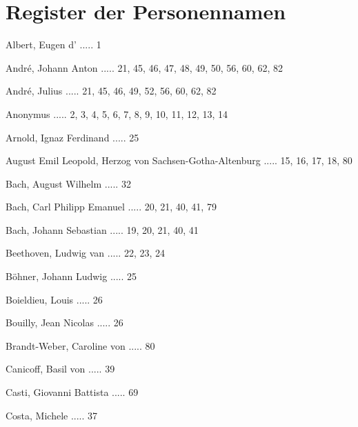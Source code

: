 \documentclass[a4paper, twocolumn, 11pt]{book}
\begin{document}
\chapter*{\centering Register der Personennamen}
\fancyhead{}


\newline 
Albert, Eugen d' ..... 1

\newline 
André, Johann Anton ..... 21, 45, 46, 47, 48, 49, 50, 56, 60, 62, 82

\newline 
André, Julius ..... 21, 45, 46, 49, 52, 56, 60, 62, 82

\newline 
Anonymus ..... 2, 3, 4, 5, 6, 7, 8, 9, 10, 11, 12, 13, 14

\newline 
Arnold, Ignaz Ferdinand ..... 25

\newline 
August Emil Leopold, Herzog von Sachsen-Gotha-Altenburg ..... 15, 16, 17, 18, 80

\newline 
Bach, August Wilhelm ..... 32

\newline 
Bach, Carl Philipp Emanuel ..... 20, 21, 40, 41, 79

\newline 
Bach, Johann Sebastian ..... 19, 20, 21, 40, 41

\newline 
Beethoven, Ludwig van ..... 22, 23, 24

\newline 
Böhner, Johann Ludwig ..... 25

\newline 
Boieldieu, Louis ..... 26

\newline 
Bouilly, Jean Nicolas ..... 26

\newline 
Brandt-Weber, Caroline von ..... 80

\newline 
Canicoff, Basil von ..... 39

\newline 
Casti, Giovanni Battista ..... 69

\newline 
Costa, Michele ..... 37
\end{document}

